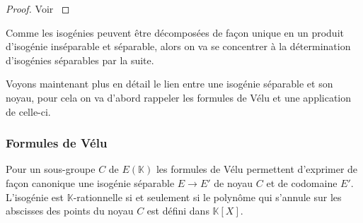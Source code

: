 \documentclass[10pt,a4paper]{book}
\theoremstyle{plain}
\theoremstyle{definition}
\theoremstyle{definition}
\theoremstyle{definition}
\theoremstyle{definition}
\theoremstyle{remark}
\theoremstyle{remark}
\theoremstyle{definition}
\begin{document}
\begin{proof}
Voir \cite[III.4.10]{Silv1}
\end{proof}

Comme les isogénies peuvent être décomposées de façon unique en un produit d'isogénie inséparable et séparable, alors on va se concentrer à la détermination d'isogénies séparables par la suite.

Voyons maintenant plus en détail le lien entre une isogénie séparable et son noyau, pour cela on va d'abord rappeler les formules de Vélu et une application de celle-ci.

\subsubsection{Formules de Vélu}
\label{sse:Vel}
Pour un sous-groupe $C$ de $E(\mathbb{K})$ les formules de Vélu \cite{velu1971} permettent d'exprimer de façon canonique une isogénie séparable $E \rightarrow E'$ de noyau $C$ et de codomaine $E'$.  L'isogénie est $\mathbb{K}$-rationnelle si et seulement si le polynôme qui s'annule sur les abscisses des points du noyau $C$ est défini dans $\mathbb{K}[X]$.
\end{document}
